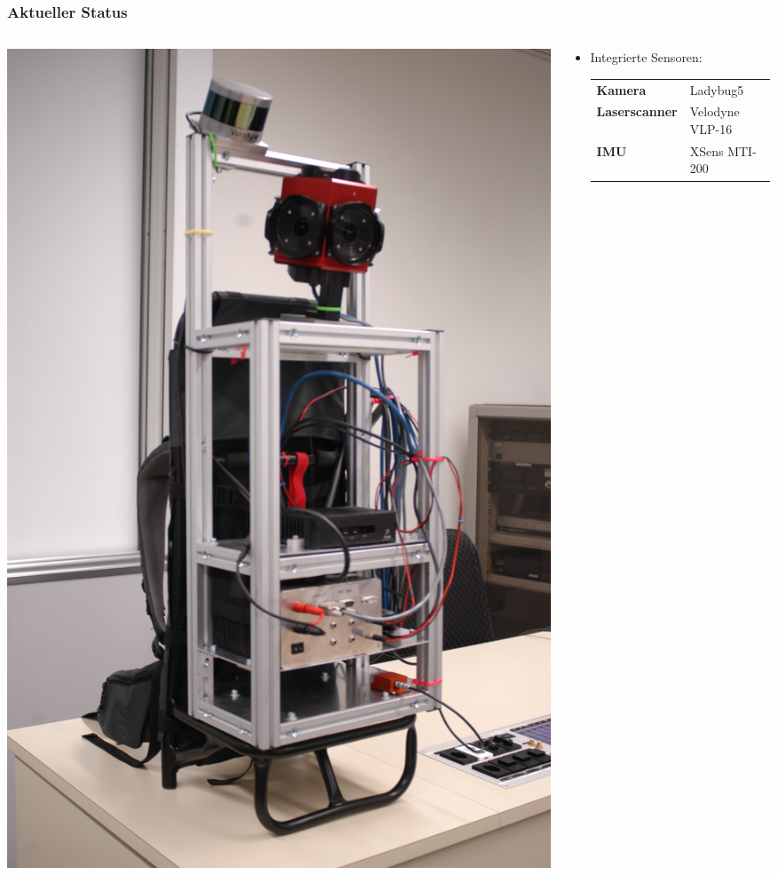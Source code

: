 \documentclass[aspectratio=169]{beamer}
\begin{document}
\begin{frame}
\frametitle{Aktueller Status}
  \begin{columns}[onlytextwidth]
    \begin{column}{0.33\textwidth}
      \includegraphics[height=0.7\textheight]{./Abbildungen/cappro_3.JPG}
    \end{column}
    \begin{column}{0.66\textwidth}
      \begin{itemize}
       \item Integrierte Sensoren:
	 \begin{tabular}{ll}
	\textbf{Kamera} & Ladybug5\\
	\textbf{Laserscanner} & Velodyne VLP-16\\
	\textbf{IMU} & XSens MTI-200

\end{tabular}
\end{itemize}
\end{column}
\end{columns}
\end{frame}
\end{document}
